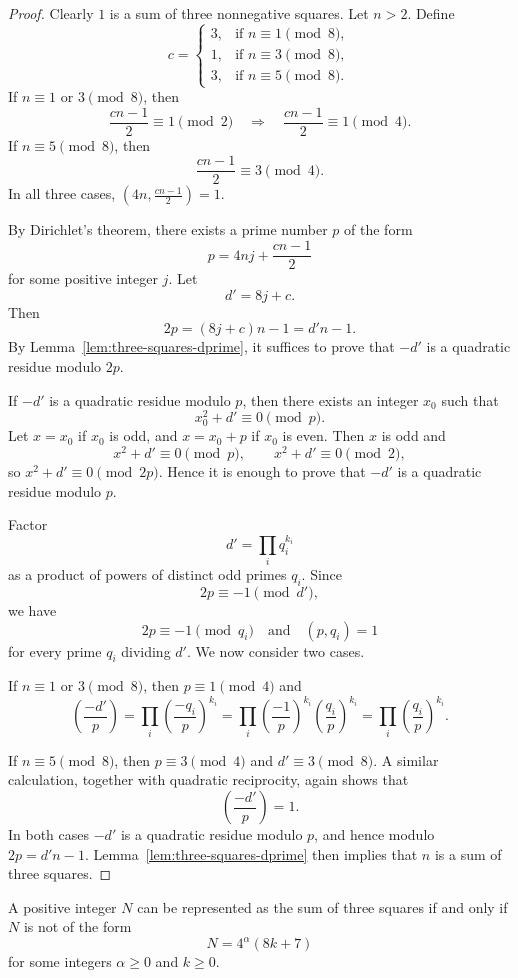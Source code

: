 \begin{proof}
\leanok
Clearly $1$ is a sum of three nonnegative squares.  Let $n>2$.  Define
\[
c =
\begin{cases}
3, &\text{if } n \equiv 1 \pmod 8,\\
1, &\text{if } n \equiv 3 \pmod 8,\\
3, &\text{if } n \equiv 5 \pmod 8.
\end{cases}
\]
If $n\equiv 1$ or $3 \pmod 8$, then
\[
\frac{cn-1}{2} \equiv 1 \pmod 2
\quad\Longrightarrow\quad
\frac{cn-1}{2} \equiv 1 \pmod 4.
\]
If $n\equiv 5 \pmod 8$, then
\[
\frac{cn-1}{2} \equiv 3 \pmod 4.
\]
In all three cases, $(4n, \tfrac{cn-1}{2}) = 1$.

By Dirichlet's theorem, there exists a prime number $p$ of the form
\[
p = 4nj + \frac{cn-1}{2}
\]
for some positive integer $j$.  Let
\[
d' = 8j + c.
\]
Then
\[
2p = (8j + c)n - 1 = d'n - 1.
\]
By Lemma~\ref{lem:three-squares-dprime}, it suffices to prove that $-d'$ is
a quadratic residue modulo $2p$.

If $-d'$ is a quadratic residue modulo $p$, then there exists an integer
$x_0$ such that
\[
x_0^{2} + d' \equiv 0 \pmod p.
\]
Let $x=x_0$ if $x_0$ is odd, and $x=x_0+p$ if $x_0$ is even.  Then $x$ is odd
and
\[
x^{2} + d' \equiv 0 \pmod p,
\qquad
x^{2} + d' \equiv 0 \pmod 2,
\]
so $x^{2} + d' \equiv 0 \pmod{2p}$.  Hence it is enough to prove that $-d'$ is
a quadratic residue modulo $p$.

Factor
\[
d' = \prod_i q_i^{k_i}
\]
as a product of powers of distinct odd primes $q_i$.  Since
\[
2p \equiv -1 \pmod{d'},
\]
we have
\[
2p \equiv -1 \pmod{q_i}
\quad\text{and}\quad
(p,q_i)=1
\]
for every prime $q_i$ dividing $d'$.  We now consider two cases.

If $n\equiv 1$ or $3\pmod 8$, then $p\equiv 1\pmod 4$ and
\[
\left(\frac{-d'}{p}\right)
 = \prod_i \left(\frac{-q_i}{p}\right)^{k_i}
 = \prod_i \left(\frac{-1}{p}\right)^{k_i}
         \left(\frac{q_i}{p}\right)^{k_i}
 = \prod_i \left(\frac{q_i}{p}\right)^{k_i}.
\]

If $n\equiv 5\pmod 8$, then $p\equiv 3\pmod 4$ and $d'\equiv 3\pmod 8$.
A similar calculation, together with quadratic reciprocity, again shows that
\[
\left(\frac{-d'}{p}\right) = 1.
\]
In both cases $-d'$ is a quadratic residue modulo $p$, and hence modulo
$2p=d'n-1$.  Lemma~\ref{lem:three-squares-dprime} then implies that $n$ is
a sum of three squares.
\end{proof}

\begin{theorem}[Gauss]
\label{thm:Gauss-three-squares}
\leanok
A positive integer $N$ can be represented as the sum of three squares if and
only if $N$ is not of the form
\[
N = 4^{\alpha}(8k+7)
\]
for some integers $\alpha\ge 0$ and $k\ge 0$.
\end{theorem}

